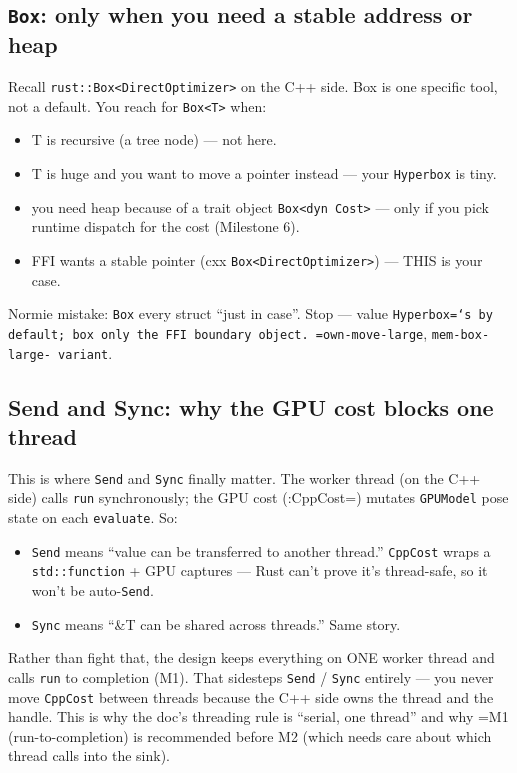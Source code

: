 \documentclass[11pt]{article}
\begin{document}
\subsection{\texttt{Box}: only when you need a stable address or heap}
\label{sec:orgd5f35c1}

Recall \texttt{rust::Box<DirectOptimizer>} on the C++ side. Box is one specific tool,
not a default. You reach for \texttt{Box<T>} when:

\begin{itemize}
\item T is recursive (a tree node) — not here.
\item T is huge and you want to move a pointer instead — your \texttt{Hyperbox} is tiny.
\item you need heap because of a trait object \texttt{Box<dyn Cost>} — only if you pick
runtime dispatch for the cost (Milestone 6).
\item FFI wants a stable pointer (cxx \texttt{Box<DirectOptimizer>}) — THIS is your case.
\end{itemize}

Normie mistake: \texttt{Box} every struct ``just in case''. Stop — value \texttt{Hyperbox=`s by
default; box only the FFI boundary object. =own-move-large}, \texttt{mem-box-large-
variant}.
\subsection{Send and Sync: why the GPU cost blocks one thread}
\label{sec:org3838b35}

This is where \texttt{Send} and \texttt{Sync} finally matter. The worker thread (on the C++
side) calls \texttt{run} synchronously; the GPU cost (:CppCost=) mutates \texttt{GPUModel}
pose state on each \texttt{evaluate}. So:

\begin{itemize}
\item \texttt{Send} means ``value can be transferred to another thread.'' \texttt{CppCost} wraps
a \texttt{std::function} + GPU captures — Rust can't prove it's thread-safe, so it
won't be auto-\texttt{Send}.
\item \texttt{Sync} means ``\&T can be shared across threads.'' Same story.
\end{itemize}

Rather than fight that, the design keeps everything on ONE worker thread and
calls \texttt{run} to completion (M1). That sidesteps \texttt{Send} / \texttt{Sync} entirely — you never
move \texttt{CppCost} between threads because the C++ side owns the thread and the
handle. This is why the doc's threading rule is ``serial, one thread'' and why
=M1 (run-to-completion) is recommended before M2 (which needs care about which
thread calls into the sink).
\end{document}
